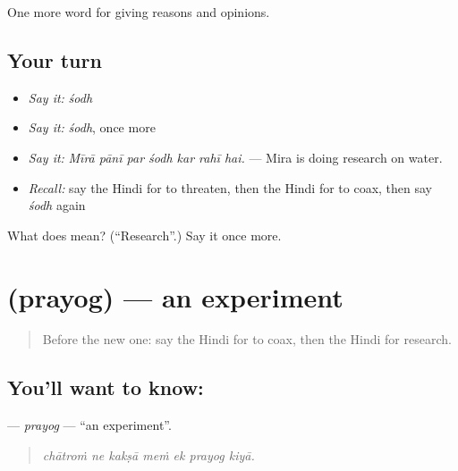 \begin{grammarlens}[title={What you've built}]
One more word for giving reasons and opinions.
\end{grammarlens}

\subsection*{Your turn}
\begin{itemize}
\raggedright
  \item \emph{Say it:} \emph{śodh}
  \item \emph{Say it:} \emph{śodh}, once more
  \item \emph{Say it:} \emph{Mīrā pānī par śodh kar rahī hai.} — Mira is doing research on water.
  \item \emph{Recall:} say the Hindi for to threaten, then the Hindi for to coax, then say \emph{śodh} again
\end{itemize}

\begin{tcolorbox}[breakable,colback=teal!4,colframe=teal!35!black,title={Before you move on}]
What does  mean? (\textquotedblleft{}Research\textquotedblright{}.) Say it once more.
\end{tcolorbox}
\section[\texorpdfstring{\hi{प्रयोग} (prayog)}{प्रयोग (prayog)}]{ (prayog) — an experiment}

\label{lesson:HI-C361-prayog}



\begin{quote}
Before the new one: say the Hindi for to coax, then the Hindi for research.
\end{quote}

\subsection*{You'll want to know: }
\textbf{} — \emph{prayog} — \textquotedblleft{}an experiment\textquotedblright{}.

\begin{quote}
      
\end{quote}

\begin{quote}
\emph{chātroṁ ne kakṣā meṁ ek prayog kiyā.}
\end{quote}

